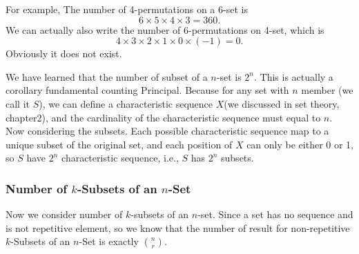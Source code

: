         For example, The number of 4-permutations on a 6-set is $$6\times 5 \times 4 \times 3=360.$$
        We can actually also write the number of 6-permutations on 4-set, which is 
        $$4 \times 3\times 2\times 1 \times 0 \times (-1)=0.$$
        Obviously it does not exist.

        We have learned that the number of subset of a $n$-set is $2^n$. This is actually a corollary fundamental counting Principal. Because for any set with $n$ member (we call it $S$),
        we can define a characteristic sequence $X$(we discussed in set theory, chapter2), and the cardinality of the characteristic sequence must equal to $n$. Now considering
        the subsets. Each possible characteristic sequence map to a unique subset of the original set, and each position of $X$ can only be either 0 or 1, so $S$ have $2^n$ 
        characteristic sequence, i.e., $S$ has $2^n$ subsets.
        
        \subsubsection*{Number of $k$-Subsets of an $n$-Set}
        Now we consider number of $k$-subsets of an $n$-set. Since a set has no sequence and is not repetitive 
        element, so we know that the number of result for non-repetitive $k$-Subsets of an $n$-Set is 
        exactly $\binom{n}{r}$.

